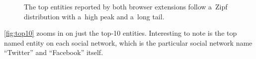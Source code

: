 \documentclass{iosart2c}
\begin{document}
\begin{figure}
  \centering
    \qquad
\caption{The top entities reported by both browser extensions follow a~Zipf distribution with a~high peak and a~long tail.}
\label{fig:topentities}
\end{figure}

\autoref{fig:top10} zooms in on just the top-10 entities.
Interesting to note is the top named entity on each social network, which is the particular social network name ``Twitter'' and ``Facebook'' itself. 
\end{document}
